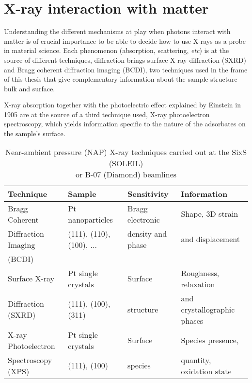 \section{X-ray interaction with matter}

Understanding the different mechanisms at play when photons interact with matter is of crucial importance to be able to decide how to use X-rays as a probe in material science.
Each phenomenon (absorption, scattering, \textit{etc}) is at the source of different techniques, diffraction brings surface X-ray diffraction (SXRD) and Bragg coherent diffraction imaging (BCDI), two techniques used in the frame of this thesis that give complementary information about the sample structure bulk and surface.

X-ray absorption together with the photoelectric effect explained by Einstein in 1905 are at the source of a third technique used, X-ray photoelectron spectroscopy, which yields information specific to the nature of the adsorbates on the sample's surface.

\begin{table}[!htb]
    \centering
    \small
    \begin{tabular}{l|l|l|l}
        Technique & Sample & Sensitivity & Information \\
        \toprule
        Bragg Coherent & Pt nanoparticles & Bragg electronic & Shape, 3D strain  \\
        Diffraction Imaging & (111), (110), (100), ... & density and phase & and displacement \\
        (BCDI) &  &  & \\
        \midrule
        Surface X-ray & Pt single crystals & Surface & Roughness, relaxation \\
        Diffraction (SXRD) & (111), (100), (311) & structure & and crystallographic phases \\
        \midrule
        X-ray Photoelectron & Pt single crystals & Surface & Species presence, \\
        Spectroscopy (XPS) & (111), (100) & species & quantity, oxidation state \\
        \bottomrule
    \end{tabular}
    \caption{Near-ambient pressure (NAP) X-ray techniques carried out at the SixS (SOLEIL) \\ or B-07 (Diamond) beamlines}
    \label{tab:techniques}
\end{table}


